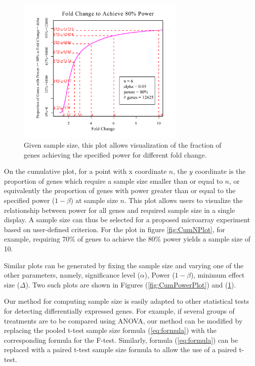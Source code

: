 \documentclass{bioinfo}
\begin{document}
\begin{figure}[h]
  \centerline{\includegraphics*[width=3.2in]{CumFoldChangePlotP.pdf}}
  \caption[Given Sample Size, Fold Change (Effect Size) Necessary to
    Achieving a Specified Power]{Given sample size, this plot allows visualization of the fraction of genes achieving the specified power for different fold change.}
  \label{fig:CumFoldChangePlot}
\end{figure}

On the cumulative plot, for a point with x coordinate $n$, the $y$
coordinate is the proportion of genes which require a sample size
smaller than or equal to $n$, or equivalently the proportion of
genes with power greater than or equal to the specified power
($1-\beta$) at sample size $n$. This plot allows users to visualize
the relationship between power for all genes and required sample
size in a single display.  A sample size can thus be selected for a
proposed microarray experiment based on user-defined criterion. For
the plot in figure \ref{fig:CumNPlot}, for example, requiring $70\%$
of genes to achieve the $80\%$ power yields a sample size of 10.

Similar plots can be generated by fixing the sample size and
varying one of the other parameters, namely, significance level
($\alpha$), Power ($1-\beta$), minimum effect size ($\Delta$). Two
such plots are shown in Figures (\ref{fig:CumPowerPlot}) and
(\ref{fig:CumFoldChangePlot}).

Our method for computing sample size is easily adapted to other
statistical tests for detecting differentially expressed genes. For
example, if several groups of treatments are to be compared using
ANOVA, our method can be modified by replacing the pooled t-test
sample size formula (\ref{eq:formula}) with the corresponding
formula for the F-test. Similarly, formula (\ref{eq:formula}) can be
replaced with a paired t-test sample size formula to allow the use
of a paired t-test.
\end{document}
